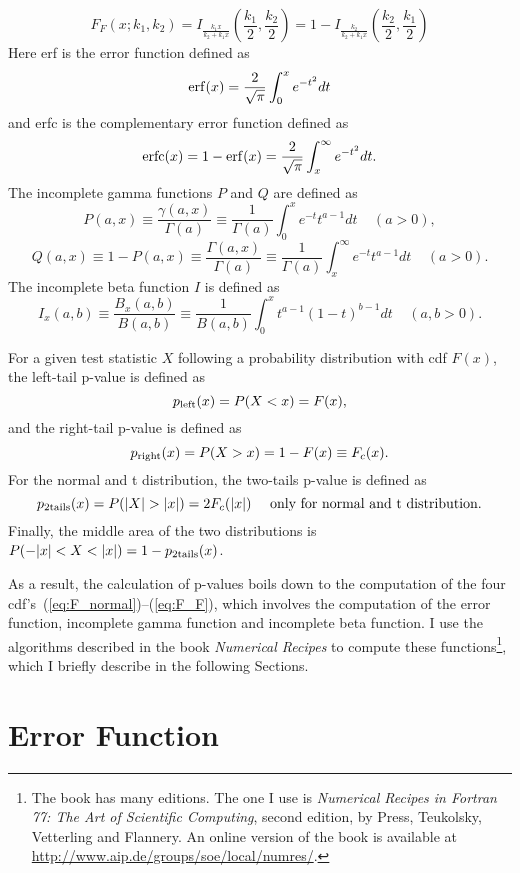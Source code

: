\documentclass[12pt]{article}
\newcommand \beq {\begin{equation}}
\newcommand \eeq {\end{equation}}
\begin{document}
\beq
  F_F(x;k_1,k_2) = I_{\frac{k_1 x}{k_2+k_1 x}}\left(\frac{k_1}{2},\frac{k_2}{2}\right) =
1-I_{\frac{k_2}{k_2+k_1 x}}\left(\frac{k_2}{2},\frac{k_1}{2}\right)
\label{eq:F_F}
\eeq
Here erf is the error function defined as 
\beq
  {\rm erf}(x) = \frac{2}{\sqrt{\pi}} \int_0^x e^{-t^2} dt 
\eeq
and erfc is the complementary error function defined as 
\beq
  {\rm erfc}(x) = 1-{\rm erf}(x) = \frac{2}{\sqrt{\pi}} \int_x^{\infty} e^{-t^2} dt .
\eeq
The incomplete gamma functions $P$ and $Q$ are defined as 
\beq
  P(a,x) \equiv \frac{\gamma(a,x)}{\Gamma(a)} \equiv \frac{1}{\Gamma(a)}\int_0^x 
e^{-t} t^{a-1} dt \ \ \ \ \ (a>0) ,
\label{eq:gammp}
\eeq
\beq
  Q(a,x) \equiv 1-P(a,x) \equiv \frac{\Gamma(a,x)}{\Gamma(a)} \equiv \frac{1}{\Gamma(a)} 
\int_x^{\infty} e^{-t} t^{a-1} dt \ \ \ \ \ (a>0) .
\label{eq:gammq}
\eeq
The incomplete beta function $I$ is defined as 
\beq
  I_x(a,b) \equiv \frac{B_x(a,b)}{B(a,b)} \equiv \frac{1}{B(a,b)}\int_0^x 
t^{a-1} (1-t)^{b-1} dt \ \ \ \ \ (a,b>0) .
\label{eq:betai}
\eeq

For a given test statistic $X$ following a probability distribution with cdf $F(x)$, 
the left-tail p-value is defined as 
\beq
  p_{\rm left}(x) = P(X <x) = F(x) ,
\eeq
and the right-tail p-value is defined as 
\beq
  p_{\rm right}(x) = P(X > x) = 1-F(x) \equiv F_c(x) .
\eeq
For the normal and t distribution, the two-tails p-value is defined as 
\beq
  p_{\rm 2tails}(x) = P(|X| > |x|) = 2 F_c(|x|) 
\ \ \ \ \mbox{only for normal and t distribution}.
\eeq
Finally, the middle area of the two distributions is $P(-|x|<X<|x|) = 1-p_{\rm 2tails}(x)$. 

As a result, the calculation of p-values boils down to the computation of the 
four cdf's~(\ref{eq:F_normal})--(\ref{eq:F_F}), which involves the computation 
of the error function, incomplete gamma function and incomplete beta function. 
I use the algorithms described in the book {\it Numerical Recipes} to compute 
these functions\footnote{The book has many editions. The one I use is {\it Numerical 
Recipes in Fortran 77: The Art of Scientific Computing}, second edition, by Press, 
Teukolsky, Vetterling and Flannery. An online version of the book is available 
at \url{http://www.aip.de/groups/soe/local/numres/}.}, 
which I briefly describe in the following Sections.

\section{Error Function}
\end{document}
